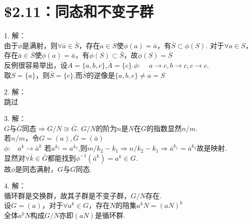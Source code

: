 \documentclass{ctexart}
\begin{document}
\section*{\$2.11：同态和不变子群}
1. 
解：\\
由于$\phi$是满射，则$\forall \bar{a} \in \bar{S}$，存在$a \in S$使$\phi(a)=\bar{a}$，有$\bar{S} \subset \phi(S)$. 对于$\forall a \in S$，存在$\bar{a} \in \bar{S}$使$\phi(a)=\bar{a}$，有$\phi(S) \subset \bar{S}$，故$\phi(S)=\bar{S}$\\
反例很容易举出，设$A=\{a,b,c\}$,$\bar{A}=\{c\}$.$\phi: \ \ \ \ \ a\rightarrow c,b \rightarrow c, c \rightarrow c$. \\
取$S=\{a\}$，则$\bar{S}=\{c\}$.而$\bar{S}$的逆像是$\{a,b,c\} \neq {a} = S$

2. 
解：\\
跳过

3. 
解：\\
$G$与$\bar{G}$同态$\Rightarrow G/N \cong \bar{G}$. $G/N$的阶为$n$是$N$在$G$的指数显然$n/m$.\\
若$n/m$，令$G=(a), \bar{G}=(\bar{a})$\\
$\phi: \ \ \ \ a^k \rightarrow \bar{a}^k$
若$a^{k_1}=a^{k_2}$,则$m/k_2-k_1 \Rightarrow n/k_2-k_1 \Rightarrow \bar{a}^{k_1}=\bar{a}^{k_2}$故是映射.\\
显然对$\forall \bar{k} \in \bar{G}$都能找到$\phi^{-1}(\bar{a}^k)=a^k \in G$.\\
故$\phi$是同态满射，$G$与$G$同态.

4.
解：\\
循环群是交换群，故其子群是不变子群，$G/N$存在.\\
设$G=(a)$，对于$\forall a^k \in G$，存在$N$的陪集$a^kN=(aN)^k$\\
全体$a^kN$构成$G/N$亦即$(aN)$是循环群.
\end{document}
